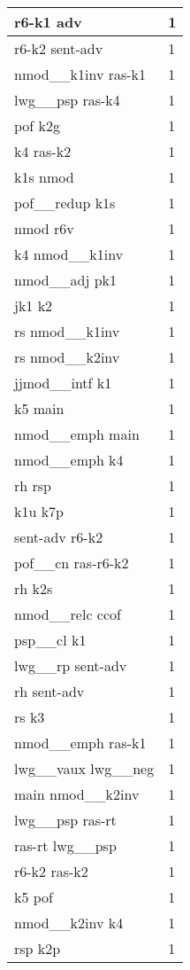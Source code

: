 \documentclass[a4 paper]{article}
\begin{document}
\begin{longtable}{p{}p{}}
r6-k1 adv  & 1 \\ \midrule
r6-k2 sent-adv  & 1 \\ \midrule
nmod\_\_k1inv ras-k1  & 1 \\ \midrule
lwg\_\_psp ras-k4  & 1 \\ \midrule
pof k2g  & 1 \\ \midrule
k4 ras-k2  & 1 \\ \midrule
k1s nmod  & 1 \\ \midrule
pof\_\_redup k1s  & 1 \\ \midrule
nmod r6v  & 1 \\ \midrule
k4 nmod\_\_k1inv  & 1 \\ \midrule
nmod\_\_adj pk1  & 1 \\ \midrule
jk1 k2  & 1 \\ \midrule
rs nmod\_\_k1inv  & 1 \\ \midrule
rs nmod\_\_k2inv  & 1 \\ \midrule
jjmod\_\_intf k1  & 1 \\ \midrule
k5 main  & 1 \\ \midrule
nmod\_\_emph main  & 1 \\ \midrule
nmod\_\_emph k4  & 1 \\ \midrule
rh rsp  & 1 \\ \midrule
k1u k7p  & 1 \\ \midrule
sent-adv r6-k2  & 1 \\ \midrule
pof\_\_cn ras-r6-k2  & 1 \\ \midrule
rh k2s  & 1 \\ \midrule
nmod\_\_relc ccof  & 1 \\ \midrule
psp\_\_cl k1  & 1 \\ \midrule
lwg\_\_rp sent-adv  & 1 \\ \midrule
rh sent-adv  & 1 \\ \midrule
rs k3  & 1 \\ \midrule
nmod\_\_emph ras-k1  & 1 \\ \midrule
lwg\_\_vaux lwg\_\_neg  & 1 \\ \midrule
main nmod\_\_k2inv  & 1 \\ \midrule
lwg\_\_psp ras-rt  & 1 \\ \midrule
ras-rt lwg\_\_psp  & 1 \\ \midrule
r6-k2 ras-k2  & 1 \\ \midrule
k5 pof  & 1 \\ \midrule
nmod\_\_k2inv k4  & 1 \\ \midrule
rsp k2p  & 1 \\ \midrule

\end{longtable}
\end{document}
